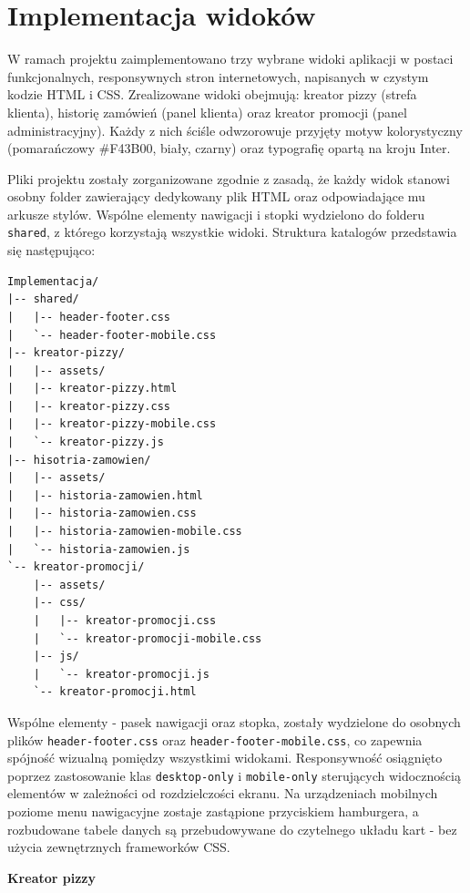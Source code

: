 \chapter{Implementacja widoków}

W ramach projektu zaimplementowano trzy wybrane widoki aplikacji w postaci funkcjonalnych, responsywnych stron internetowych, napisanych w czystym kodzie HTML i CSS. Zrealizowane widoki obejmują: kreator pizzy (strefa klienta), historię zamówień (panel klienta) oraz kreator promocji (panel administracyjny). Każdy z nich ściśle odwzorowuje przyjęty motyw kolorystyczny (pomarańczowy \#F43B00, biały, czarny) oraz typografię opartą na kroju Inter.
\vspace{5pt}

Pliki projektu zostały zorganizowane zgodnie z zasadą, że każdy widok stanowi osobny folder zawierający dedykowany plik HTML oraz odpowiadające mu arkusze stylów. Wspólne elementy nawigacji i stopki wydzielono do folderu \texttt{shared}, z którego korzystają wszystkie widoki. Struktura katalogów przedstawia się następująco:

\begin{lstlisting}
Implementacja/
|-- shared/
|   |-- header-footer.css
|   `-- header-footer-mobile.css
|-- kreator-pizzy/
|   |-- assets/
|   |-- kreator-pizzy.html
|   |-- kreator-pizzy.css
|   |-- kreator-pizzy-mobile.css
|   `-- kreator-pizzy.js
|-- hisotria-zamowien/
|   |-- assets/
|   |-- historia-zamowien.html
|   |-- historia-zamowien.css
|   |-- historia-zamowien-mobile.css
|   `-- historia-zamowien.js
`-- kreator-promocji/
    |-- assets/
    |-- css/
    |   |-- kreator-promocji.css
    |   `-- kreator-promocji-mobile.css
    |-- js/
    |   `-- kreator-promocji.js
    `-- kreator-promocji.html
\end{lstlisting}
\vspace{5pt}

Wspólne elementy - pasek nawigacji oraz stopka, zostały wydzielone do osobnych plików \texttt{header-footer.css} oraz \texttt{header-footer-mobile.css}, co zapewnia spójność wizualną pomiędzy wszystkimi widokami. Responsywność osiągnięto poprzez zastosowanie klas \texttt{desktop-only} i \texttt{mobile-only} sterujących widocznością elementów w zależności od rozdzielczości ekranu. Na urządzeniach mobilnych poziome menu nawigacyjne zostaje zastąpione przyciskiem hamburgera, a rozbudowane tabele danych są przebudowywane do czytelnego układu kart - bez użycia zewnętrznych frameworków CSS.

\vspace{10pt}
\textbf{Kreator pizzy}
\vspace{5pt}

